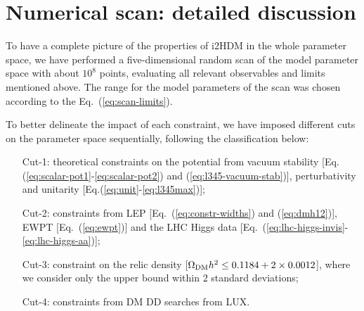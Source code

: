 \documentclass[12pt,a4paper]{article}
\begin{document}
\appendix

\section{Numerical scan: detailed discussion}

To have a complete picture of the properties of i2HDM in the whole parameter space, we have performed a
five-dimensional random scan of the model parameter space with about $10^8$ points, evaluating all relevant
observables and limits mentioned above. The range for 
the model parameters of the scan was chosen according to the Eq.~(\ref{eq:scan-limits}).



To better delineate the impact of each constraint, we have imposed different cuts on the parameter space sequentially, 
following the classification below:
\begin{itemize}
\item[Cut-1:] theoretical constraints on the potential from vacuum stability 
[Eq.(\ref{eq:scalar-pot1}-\ref{eq:scalar-pot2}) and (\ref{eq:l345-vacuum-stab})], perturbativity  and
unitarity [Eq.(\ref{eq:unit}-\ref{eq:l345max})];
\item[Cut-2:] constraints from LEP [Eq.~(\ref{eq:constr-widths}) and (\ref{eq:dmh12})], EWPT
[Eq.~(\ref{eq:ewpt})] and the LHC Higgs data
[Eq.~(\ref{eq:lhc-higgs-invis}-\ref{eq:lhc-higgs-aa})];
\item[Cut-3:] constraint on the relic
density  [$\Omega_{\rm DM} h^2 \le 0.1184+2\times 0.0012$], where we consider only the upper bound within 2 standard deviations;
\item[Cut-4:] constraints from DM DD searches from LUX.
\end{itemize}
\end{document}

